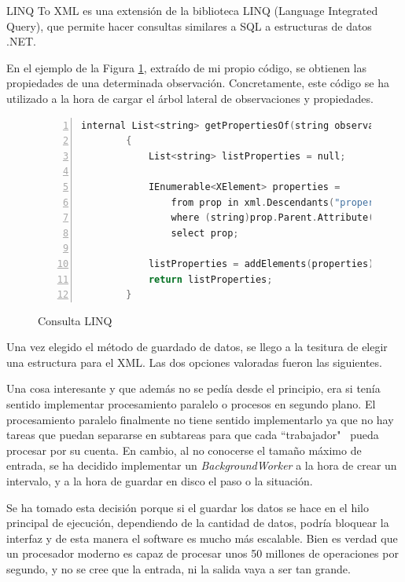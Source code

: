 LINQ To XML es una extensi\'on de la biblioteca LINQ (Language Integrated Query), que permite hacer consultas
similares a SQL a estructuras de datos .NET. 

En el ejemplo de la Figura \ref{Consulta LINQ}, extra\'ido de mi propio c\'odigo, se obtienen las propiedades de
una determinada observaci\'on.
Concretamente, este c\'odigo se ha utilizado a la hora de cargar el \'arbol lateral
de observaciones y propiedades.

\begin{figure}[h]
	\begin{lstlisting}[tabsize=2, language=C, numbers=left, showspaces=false, breaklines=true]
		internal List<string> getPropertiesOf(string observation)
        {
            List<string> listProperties = null;
            
            IEnumerable<XElement> properties =
                from prop in xml.Descendants("property")
                where (string)prop.Parent.Attribute("name") == observation
                select prop;
            
            listProperties = addElements(properties);
            return listProperties;
        }
	\end{lstlisting}
	\caption[Consulta LINQ]{Consulta LINQ}
	\label{Consulta LINQ}
\end{figure}

Una vez elegido el m\'etodo de guardado de datos, se llego a la tesitura de elegir una estructura para el XML.
Las dos opciones valoradas fueron las siguientes.

Una cosa interesante y que adem\'as no se ped\'ia desde el principio, era si 
ten\'ia sentido implementar procesamiento paralelo o procesos en segundo plano. El 
procesamiento paralelo finalmente no tiene sentido implementarlo ya que no hay tareas
que puedan separarse en subtareas para que cada ``trabajador" \ pueda procesar por su
cuenta. En cambio, al no conocerse el tama\~no m\'aximo de entrada, se ha decidido
implementar un \emph{BackgroundWorker} a la hora de crear un intervalo, y a la hora
de guardar en disco el paso o la situaci\'on.

Se ha tomado esta decisi\'on porque si el guardar los datos se hace en el hilo principal
de ejecuci\'on, dependiendo de la cantidad de datos, podr\'ia bloquear la interfaz y
de esta manera el software es mucho m\'as escalable. Bien es
verdad que un procesador moderno es capaz de procesar unos 50 millones de operaciones por
segundo, y no se cree que la entrada, ni la salida vaya a ser tan grande.


